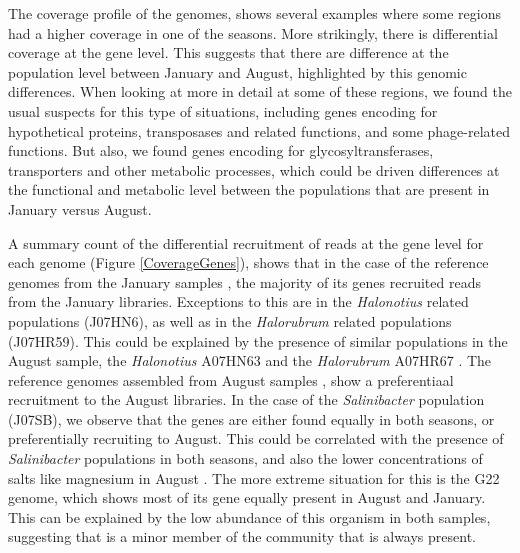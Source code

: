 The coverage profile of the genomes, shows several examples where some regions had a higher coverage in one of the seasons. More strikingly, there is differential coverage at the gene level. This suggests that there are difference at the population level between January and August, highlighted by this genomic differences. When looking at more in detail at some of these regions, we found the usual suspects for this type of situations, including genes encoding for hypothetical proteins, transposases and related functions, and some phage-related functions. But also, we found genes encoding for glycosyltransferases, transporters and other metabolic processes, which could be driven differences at the functional and metabolic level between the populations that are present in January versus August.

A summary count of the differential recruitment of reads at the gene level for each genome (Figure \ref{CoverageGenes}), shows that in the case of the reference genomes from the January samples \cite{Podell:2013kx}, the majority of its genes recruited reads from the January libraries. Exceptions to this are in the \textit{Halonotius} related populations (J07HN6), as well as in the \textit{Halorubrum} related populations (J07HR59). This could be explained by the presence of similar populations in the August sample, the \textit{Halonotius} A07HN63 and the \textit{Halorubrum} A07HR67 \cite{Podell:2013fp}. The reference genomes assembled from August samples \cite{Podell:2013fp}, show a preferentiaal recruitment to the August libraries. In the case of the \textit{Salinibacter} population (J07SB), we observe that the genes are either found equally in both seasons, or preferentially recruiting to August. This could be correlated with the presence of \textit{Salinibacter} populations in both seasons, and also the lower concentrations of salts like magnesium in August \cite{Podell:2013fp}. The more extreme situation for this is the G22 genome, which shows most of its gene equally present in August and January. This can be explained by the low abundance of this organism in both samples, suggesting that is a minor member of the community that is always present.


